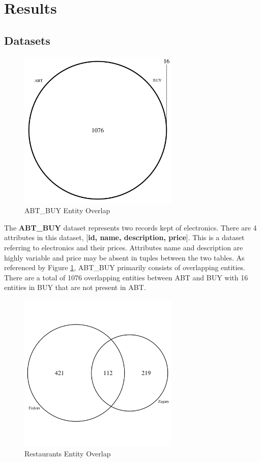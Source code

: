 \documentclass[letterpaper,twocolumn,10pt]{article}
\begin{document}
\section{Results}
\subsection{Datasets}

\begin{figure}[H]
\centering
\includegraphics[width=3in]{figures/abt_buy_venn.png}
\caption{ABT\_BUY Entity Overlap}
\label{fig:abt-buy-png}
\end{figure}

The \textbf{ABT\_BUY} dataset represents two records kept of electronics. There are 4 attributes in this dataset, [\textbf{id, name, description, price}]. This is a dataset referring to electronics and their prices. Attributes name and description are highly variable and price may be absent in tuples between the two tables. As referenced by Figure \ref{fig:abt-buy-png}, ABT\_BUY primarily consists of overlapping entities. There are a total of 1076 overlapping entities between ABT and BUY with 16 entities in BUY that are not present in ABT.

\begin{figure}[H]
\centering
\includegraphics[width=3in]{figures/restaurants_venn.png}
\caption{Restaurants Entity Overlap}
\label{fig:restaurants-png}
\end{figure}
\end{document}
